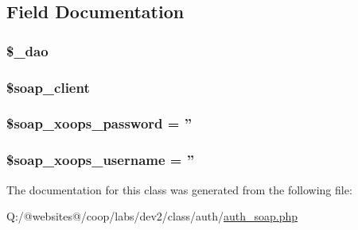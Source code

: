 \subsection{Field Documentation}
\hypertarget{class_xortify_auth_soap_a12a029c610f699b4b25e79a1f64a3485}{
\subsubsection[{\$\-\_\-dao}]{\setlength{\rightskip}{0pt plus 5cm}\$\-\_\-dao}}\label{class_xortify_auth_soap_a12a029c610f699b4b25e79a1f64a3485}
\hypertarget{class_xortify_auth_soap_a18c3d5ef7b606d5f21c8fda9d08e8c7e}{
\subsubsection[{\$soap\-\_\-client}]{\setlength{\rightskip}{0pt plus 5cm}\$soap\-\_\-client}}\label{class_xortify_auth_soap_a18c3d5ef7b606d5f21c8fda9d08e8c7e}
\hypertarget{class_xortify_auth_soap_ac116a126fa48c572acc0a859f42fa8dc}{
\subsubsection[{\$soap\-\_\-xoops\-\_\-password}]{\setlength{\rightskip}{0pt plus 5cm}\$soap\-\_\-xoops\-\_\-password = ''}}\label{class_xortify_auth_soap_ac116a126fa48c572acc0a859f42fa8dc}
\hypertarget{class_xortify_auth_soap_ab46ae973f580890282bce8dbe346abab}{
\subsubsection[{\$soap\-\_\-xoops\-\_\-username}]{\setlength{\rightskip}{0pt plus 5cm}\$soap\-\_\-xoops\-\_\-username = ''}}\label{class_xortify_auth_soap_ab46ae973f580890282bce8dbe346abab}


The documentation for this class was generated from the following file\-:\begin{DoxyCompactItemize}
\item 
Q\-:/@websites@/coop/labs/dev2/class/auth/\hyperlink{auth__soap_8php}{auth\-\_\-soap.\-php}\end{DoxyCompactItemize}
